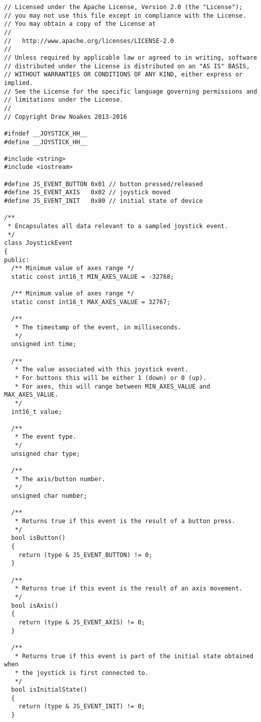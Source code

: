 \documentclass[a4paper,11pt]{article}
\begin{document}
\linespread{0.8}
\begin{lstlisting}
// Licensed under the Apache License, Version 2.0 (the "License");
// you may not use this file except in compliance with the License.
// You may obtain a copy of the License at
//
//   http://www.apache.org/licenses/LICENSE-2.0
//
// Unless required by applicable law or agreed to in writing, software
// distributed under the License is distributed on an "AS IS" BASIS,
// WITHOUT WARRANTIES OR CONDITIONS OF ANY KIND, either express or implied.
// See the License for the specific language governing permissions and
// limitations under the License.
//
// Copyright Drew Noakes 2013-2016

#ifndef __JOYSTICK_HH__
#define __JOYSTICK_HH__

#include <string>
#include <iostream>

#define JS_EVENT_BUTTON 0x01 // button pressed/released
#define JS_EVENT_AXIS   0x02 // joystick moved
#define JS_EVENT_INIT   0x80 // initial state of device

/**
 * Encapsulates all data relevant to a sampled joystick event.
 */
class JoystickEvent
{
public:
  /** Minimum value of axes range */
  static const int16_t MIN_AXES_VALUE = -32768;

  /** Minimum value of axes range */
  static const int16_t MAX_AXES_VALUE = 32767;
  
  /**
   * The timestamp of the event, in milliseconds.
   */
  unsigned int time;
  
  /**
   * The value associated with this joystick event.
   * For buttons this will be either 1 (down) or 0 (up).
   * For axes, this will range between MIN_AXES_VALUE and MAX_AXES_VALUE.
   */
  int16_t value;
  
  /**
   * The event type.
   */
  unsigned char type;
  
  /**
   * The axis/button number.
   */
  unsigned char number;

  /**
   * Returns true if this event is the result of a button press.
   */
  bool isButton()
  {
    return (type & JS_EVENT_BUTTON) != 0;
  }

  /**
   * Returns true if this event is the result of an axis movement.
   */
  bool isAxis()
  {
    return (type & JS_EVENT_AXIS) != 0;
  }

  /**
   * Returns true if this event is part of the initial state obtained when
   * the joystick is first connected to.
   */
  bool isInitialState()
  {
    return (type & JS_EVENT_INIT) != 0;
  }


\end{lstlisting}
\end{document}
